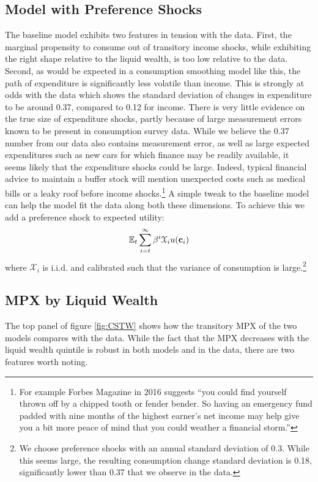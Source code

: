 \documentclass[titlepage]{\econtex}\newcommand{\texname}{ConsumptionHeterogeneity}
\begin{document}
\subsection{Model with Preference Shocks}
The baseline model exhibits two features in tension with the data. First, the marginal propensity to consume out of transitory income shocks, while exhibiting the right shape relative to the liquid wealth, is too low relative to the data. Second, as would be expected in a consumption smoothing model like this, the path of expenditure is significantly less volatile than income. This is strongly at odds with the data which shows the standard deviation of changes in expenditure to be around 0.37, compared to 0.12 for income. There is very little evidence on the true size of expenditure shocks, partly because of large measurement errors known to be present in consumption survey data. While we believe the 0.37 number from our data also contains measurement error, as well as large expected expenditures such as new cars for which finance may be readily available, it seems likely that the expenditure shocks could be large. Indeed, typical financial advice to maintain a buffer stock will mention unexpected costs such as medical bills or a leaky roof before income shocks.\footnote{For example Forbes Magazine in 2016 suggests ``you could find yourself thrown off by a chipped tooth or fender bender. So having an emergency fund padded with nine months of the highest earner's net income may help give you a bit more peace of mind that you could weather a financial storm.''} A simple tweak to the baseline model can help the model fit the data along both these dimensions. To achieve this we add a preference shock to expected utility:
\begin{align*}
\mathbb{E}_t \sum_{i=t}^{\infty} \beta^i \mathcal{X}_i u(\mathbf{c}_i)
\end{align*}
where $\mathcal{X}_i$ is i.i.d. and calibrated such that the variance of consumption is large.\footnote{We choose preference shocks with an annual standard deviation of 0.3. While this seems large, the resulting consumption change standard deviation is 0.18, significantly lower than 0.37 that we observe in the data.}

\subsection{MPX by Liquid Wealth} 
The top panel of figure \ref{fig:CSTW} shows how the transitory MPX of the two models compares with the data. While the fact that the MPX decreases with the liquid wealth quintile is robust in both models and in the data, there are two features worth noting. 
\end{document}
